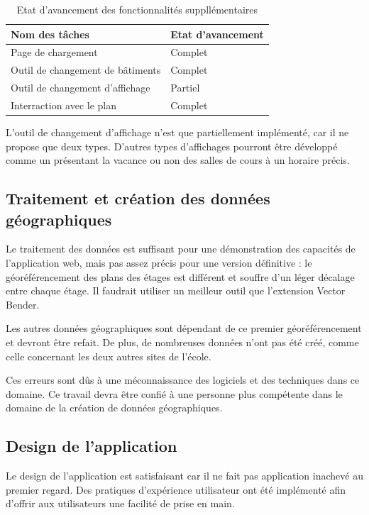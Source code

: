 \documentclass[
    iai, %
    il, %
]{heig-tb}
\begin{document}
\begin{table}[h]
    \begin{center}
        \begin{tabular}{l|l}
            Nom des tâches                   & Etat d'avancement \\ \hline
            Page de chargement               & Complet           \\
            Outil de changement de bâtiments & Complet           \\
            Outil de changement d'affichage  & Partiel           \\
            Interraction avec le plan        & Complet
        \end{tabular}
        \caption{Etat d'avancement des fonctionnalités suppllémentaires  \label{autres}}
    \end{center}
\end{table}

L'outil de changement d'affichage n'est que partiellement implémenté, car il ne propose que deux types.
D'autres types d'affichages pourront être développé comme un présentant la vacance ou non des salles de cours à un horaire précis.

\subsection{Traitement et création des données géographiques}
Le traitement des données est suffisant pour une démonstration des capacités de l'application web,
mais pas assez précis pour une version définitive : le géoréférencement des plans des étages est différent
et souffre d'un léger décalage entre chaque étage.
Il faudrait utiliser un meilleur outil que l'extension Vector Bender.

Les autres données géographiques sont dépendant de ce premier géoréférencement et devront être refait.
De plus, de nombreuses données n'ont pas été créé, comme celle concernant les deux autres sites de l'école.

Ces erreurs sont dûs à une méconnaissance des logiciels et des techniques dans ce domaine.
Ce travail devra être confié à une personne plus compétente dans le domaine de la création de données géographiques.

\subsection{Design de l'application}
Le design de l'application est satisfaisant car il ne fait pas application inachevé au premier regard.
Des pratiques d'expérience utilisateur ont été implémenté afin d'offrir aux utilisateurs une facilité de prise en main.
\end{document}
